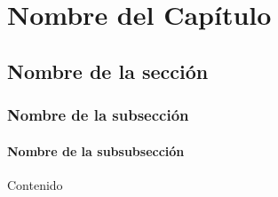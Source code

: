 \documentclass[../proyecto.tex]{memoir}
\begin{document}
\chapter{Nombre del Capítulo}

\section{Nombre de la sección}

\subsection{Nombre de la subsección}

\subsubsection{Nombre de la subsubsección}

Contenido
\end{document}
